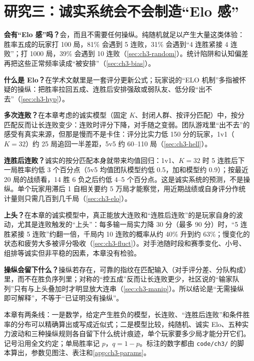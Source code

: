 \chapter{研究三：诚实系统会不会制造“Elo 感”}
\label{ch:streaks}

\begin{answerbox}
\textbf{会有“Elo 感”吗？}会，而且不需要任何操纵。纯随机就足以产生大量这类体验：胜率五成的玩家打 100 局，81\% 会遇到 5 连败，31\% 会遇到“4 连胜紧接 4 连败”；打 1000 局，39\% 会遇到 10 连败（\cref{sec:ch3-random}）。统计陷阱和认知偏差再把这些正常频率读成“被安排”（\cref{sec:ch3-bias}）。

\textbf{什么是 Elo？}在学术文献里是一套评分更新公式；玩家说的“ELO 机制”多指被怀疑的操纵：把胜率拉回五成、连胜后安排强敌或弱队友、低分段“出不去”（\cref{sec:ch3-hyp}）。

\textbf{多次连败？}在本章考虑的诚实模型（固定 $K$、封闭人群、按评分匹配）中，按分匹配反而让长连败变少：连败时评分下降，对手随之变弱。团队游戏里“出不去”的感受有真实来源，但那是慢而不是卡住：评分比实力低 150 分的玩家，1v1（$K=32$）约 25 局追回一半差距，5v5 约 60–110 局（\cref{sec:ch3-hell}）。

\textbf{连胜后连败？}诚实的按分匹配本身就带来均值回归：1v1、$K=32$ 时 5 连胜后下一局胜率约低 3 个百分点（5v5 均值团队模型约低 0.5，加和模型约 0.9）；按最近 20 局的战绩看，14 胜 6 负之后约低 4–5 个百分点。这是诚实系统的预测，不是操纵。单个玩家用滞后 1 自相关要约 5 万局才能察觉，用近期战绩或自身评分作统计量则只需几百到几千局（\cref{sec:ch3-elo}）。

\textbf{上头？}在本章的诚实模型中，真正能放大连败和“连胜后连败”的是玩家自身的波动，尤其是连败触发的“上头”：每多输一局实力降 30 分（最多 90 分）时，“5 连胜紧接 5 连败”约翻一倍，千局内 10 连败的概率从约 40\% 升到约 63\%；慢变化的状态和疲劳大多被评分吸收（\cref{sec:ch3-fluct}）。对手池随时段和赛季变化、小号、组排等诚实但非平稳的因素，本章没有检验。

\textbf{操纵会留下什么？}操纵若存在，可靠的指纹在匹配输入（对手评分差、分队构成）里，而不在胜负序列里；对称的“控五成”反而让长连败更少，社区说的“输家队列”只有与上头叠加时才明显放大连串（\cref{sec:ch3-manip}）。所以结论是“无需操纵即可解释”，不等于“已证明没有操纵”。
\end{answerbox}

本章有两条线：一是数学，给定产生胜负的模型，长连败、“连胜后连败”和条件胜率的分布可以精确算出或写成近似式；二是模型比较，纯随机、诚实 Elo、五种实力波动和三种操纵规则各自留下什么统计痕迹，单个玩家要多少局才能分开它们。记号沿用全文约定；单局胜率记 $p$，$q=1-p$。标注\tagOwn{}的数字都由 \texttt{code/ch3/} 的脚本算出，参数见图注、表注和\cref{app:ch3-params}。

